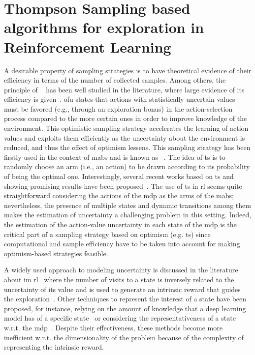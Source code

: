 \chapter{Thompson Sampling based algorithms for exploration in Reinforcement Learning}\label{C:ts}
A desirable property of sampling strategies is to have theoretical evidence of their efficiency in terms of the number of collected samples. Among others, the principle of ~\cite{lai1985asymptotically} has been well studied in the literature, where large evidence of its efficiency is given~\cite{jaksch2010near, kakade2003sample, kearns2002near}. \gls{ofu} states that actions with statistically uncertain values must be favored (e.g., through an exploration bonus) in the action-selection process compared to the more certain ones in order to improve knowledge of the environment. This optimistic sampling strategy accelerates the learning of action values and exploits them efficiently as the uncertainty about the environment is reduced, and thus the effect of optimism lessens. This sampling strategy has been firstly used in the context of \glspl{mab} and is known as ~\cite{thompson1933likelihood}. The idea of \gls{ts} is to randomly choose an arm (i.e., an action) to be drawn according to its probability of being the optimal one. Interestingly, several recent works based on \gls{ts} and showing promising results have been proposed~\cite{chapelle2011empirical, granmo2010solving, may2011simulation, scott2010modern}. The use of \gls{ts} in \gls{rl} seems quite straightforward considering the actions of the \gls{mdp} as the arms of the \glspl{mab}; nevertheless, the presence of multiple states and dynamic transitions among them makes the estimation of uncertainty a challenging problem in this setting. Indeed, the estimation of the action-value uncertainty in each state of the \gls{mdp} is the critical part of a sampling strategy based on optimism (e.g. \gls{ts}) since computational and sample efficiency have to be taken into account for making optimism-based strategies feasible.

A widely used approach to modeling uncertainty is discussed in the literature about \gls{im} \gls{rl}~\cite{chentanez2005intrinsically, schmidhuber1991possibility} where the number of visits to a state is inversely related to the uncertainty of its value and is used to generate an intrinsic reward that guides the exploration~\cite{bellemare2016unifying, tang2017exploration}. Other techniques to represent the interest of a state have been proposed, for instance, relying on the amount of knowledge that a deep learning model has of a specific state~\cite{pathak2017curiosity} or considering the representativeness of a state w.r.t. the \gls{mdp}~\cite{bonarini2006self}. Despite their effectiveness, these methods become more inefficient w.r.t. the dimensionality of the problem because of the complexity of representing the intrinsic reward.


